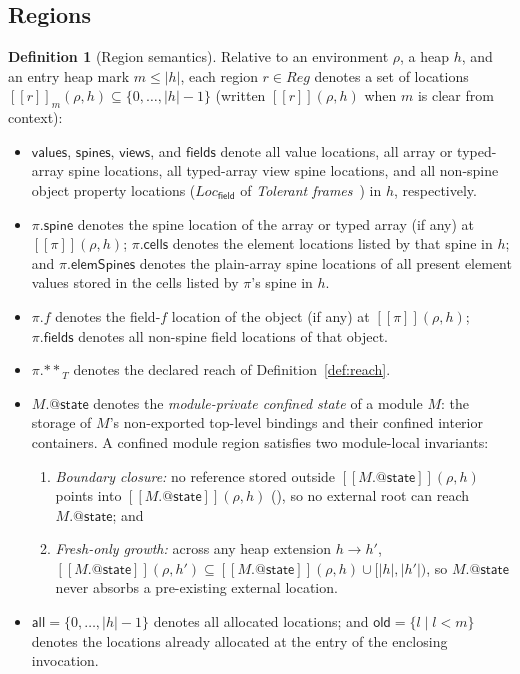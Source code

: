 \documentclass[10pt,a4paper]{article}
\makeatletter
\theoremstyle{definition}
\newtheorem{definition}{Definition}
\newcommand{\kw}[1]{\mathsf{#1}}
\newcommand{\val}{\kw{values}}
\newcommand{\st}{\kw{spines}}
\newcommand{\vw}{\kw{views}}
\newcommand{\LF}{\mathit{Loc}_{\kw{field}}}
\newcommand{\sem}[1]{[\![#1]\!]}
\newcommand{\len}[1]{|#1|}
\newcommand{\Reg}{\mathit{Reg}}
\newcommand{\reach}[2]{#1.{\ast\ast}_{#2}}
\newcommand{\modstate}[1]{#1.{@\kw{state}}}
\makeatother
\begin{document}
\subsection{Regions}

\begin{definition}[Region semantics]\label{def:regions}
Relative to an environment $\rho$, a heap $h$, and an entry heap mark
$m\le\len h$, each region $r\in\Reg$ denotes a set of locations
$\sem{r}_m(\rho,h)\subseteq\{0,\dots,\len h-1\}$ (written
$\sem{r}(\rho,h)$ when $m$ is clear from context):
\begin{itemize}[leftmargin=1.5em,itemsep=2pt]
\item $\val$, $\st$, $\vw$, and $\kw{fields}$ denote all value locations,
  all array or typed-array spine locations, all typed-array view spine
  locations, and all non-spine object property locations ($\LF$ of
  \emph{Tolerant frames}~\cite{tf}) in $h$, respectively.
\item $\pi.\kw{spine}$ denotes the spine location of the array or typed
  array (if any) at $\sem{\pi}(\rho,h)$; $\pi.\kw{cells}$ denotes the
  element locations listed by that spine in $h$; and $\pi.\kw{elemSpines}$
  denotes the plain-array spine locations of all present element values
  stored in the cells listed by $\pi$'s spine in $h$.
\item $\pi.f$ denotes the field-$f$ location of the object (if any) at
  $\sem{\pi}(\rho,h)$; $\pi.\kw{fields}$ denotes all non-spine field
  locations of that object.
\item $\reach{\pi}{T}$ denotes the declared reach of
  Definition~\ref{def:reach}.
\item $\modstate{M}$ denotes the \emph{module-private confined state} of
  a module $M$: the storage of $M$'s non-exported top-level bindings and
  their confined interior containers. A confined module region satisfies
  two module-local invariants:
  \begin{enumerate}[leftmargin=1.5em,itemsep=1pt]
  \item \emph{Boundary closure:} no reference stored outside
    $\sem{\modstate{M}}(\rho,h)$ points into $\sem{\modstate{M}}(\rho,h)$
    (), so no external root can reach
    $\modstate{M}$; and
  \item \emph{Fresh-only growth:} across any heap extension $h\to h'$,
    $\sem{\modstate{M}}(\rho,h')\subseteq\sem{\modstate{M}}(\rho,h)\cup[\len h,\len{h'})$,
    so $\modstate{M}$ never absorbs a pre-existing external location.
  \end{enumerate}
\item $\kw{all}=\{0,\dots,\len h-1\}$ denotes all allocated locations;
  and $\kw{old}=\{l\mid l<m\}$ denotes the locations already allocated at
  the entry of the enclosing invocation.
\end{itemize}
\end{definition}
\end{document}
